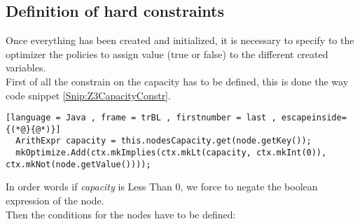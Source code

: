 \subsection{Definition of hard constraints}
Once everything has been created and initialized, it is necessary to specify to the optimizer the policies to assign value (true or false) to the different created variables.\\
First of all the constrain on the capacity has to be defined, this is done the way code snippet \ref{Snip:Z3CapacityConstr}.
\begin{lstlisting}[language = Java , frame = trBL , firstnumber = last , escapeinside={(*@}{@*)}]
  ArithExpr capacity = this.nodesCapacity.get(node.getKey());
  mkOptimize.Add(ctx.mkImplies(ctx.mkLt(capacity, ctx.mkInt(0)), ctx.mkNot(node.getValue())));
\end{lstlisting}\label{Snip:Z3CapacityConstr}
In order words if \textit{capacity} is Less Than 0, we force to negate the boolean expression of the node.\\
Then the conditions for the nodes have to be defined:
